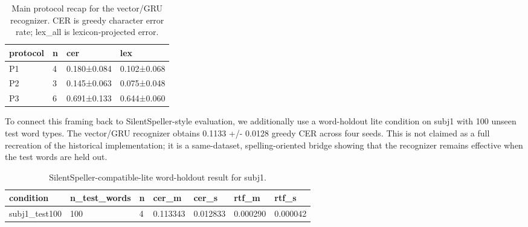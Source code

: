 
\begin{table}[t]
\centering
\caption{Main protocol recap for the vector/GRU recognizer. CER is greedy character error rate; lex_all is lexicon-projected error.}
\label{tab:main_protocols}
\begin{tabular}{llll}
\hline
protocol & n & cer & lex \\
\hline
P1 & 4 & 0.180±0.084 & 0.102±0.068 \\
P2 & 3 & 0.145±0.063 & 0.075±0.048 \\
P3 & 6 & 0.691±0.133 & 0.644±0.060 \\
\hline
\end{tabular}
\end{table}

To connect this framing back to SilentSpeller-style evaluation, we additionally use a word-holdout lite condition on subj1 with 100 unseen test word types. The vector/GRU recognizer obtains 0.1133 +/- 0.0128 greedy CER across four seeds. This is not claimed as a full recreation of the historical implementation; it is a same-dataset, spelling-oriented bridge showing that the recognizer remains effective when the test words are held out.


\begin{table}[t]
\centering
\caption{SilentSpeller-compatible-lite word-holdout result for subj1.}
\label{tab:silentspeller_lite}
\begin{tabular}{lllllll}
\hline
condition & n_test_words & n & cer_m & cer_s & rtf_m & rtf_s \\
\hline
subj1_test100 & 100 & 4 & 0.113343 & 0.012833 & 0.000290 & 0.000042 \\
\hline
\end{tabular}
\end{table}

